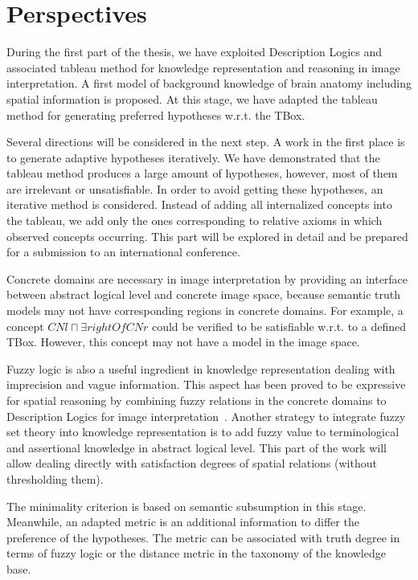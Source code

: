 \documentclass{article}
\begin{document}
\section{Perspectives}\label{sec:persp}
During the first part of the thesis, we have exploited Description Logics and associated tableau method for knowledge representation and reasoning in image interpretation.
A first model of background knowledge of brain anatomy  including spatial information is proposed.  
At this stage, we have adapted the tableau method for generating preferred hypotheses w.r.t. the TBox.

Several directions will be considered in the next step.
A work in the first place is to generate adaptive hypotheses iteratively.
We have demonstrated that the tableau method produces a large amount of hypotheses, however, most of them are irrelevant or unsatisfiable.
In order to avoid getting these hypotheses, an iterative method is considered.
Instead of adding all internalized concepts into the tableau, we add only the ones corresponding to relative axioms in which observed concepts occurring.
This part will be explored in detail and be prepared for a submission to an international conference.


Concrete domains are necessary in image interpretation by providing an interface between abstract logical level and concrete image space,
because semantic truth models may not have corresponding regions in concrete domains.
For example, a concept $CNl\sqcap \exists rightOf CNr$ could be verified to be satisfiable w.r.t. to a defined TBox.
However, this concept may not have a model in the image space.

Fuzzy logic is also a useful ingredient in knowledge representation dealing with imprecision and vague information.
This aspect has been proved to be expressive for spatial reasoning by combining fuzzy relations in the concrete domains to Description Logics for image interpretation~\cite{hudelot2008spatial}.
Another strategy to integrate fuzzy set theory into knowledge representation is to add fuzzy value to terminological and assertional knowledge in abstract logical level.
This part of the work will allow dealing directly with satisfaction degrees of spatial relations (without thresholding them).

The minimality criterion is based on semantic subsumption in this stage. Meanwhile, an adapted metric is an additional information to differ the preference of the hypotheses.
The metric can be associated with truth degree in terms of fuzzy logic or the distance metric in the taxonomy of the knowledge base. 
\end{document}
